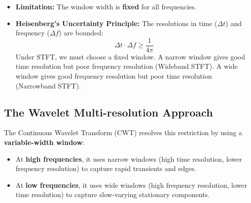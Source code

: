 \documentclass[12pt,a4paper]{article}
\begin{document}
\begin{itemize}[leftmargin=*, itemsep=3.5pt]
  \item \textbf{Limitation:} The window width is \textbf{fixed} for all frequencies. 
  \item \textbf{Heisenberg's Uncertainty Principle:} The resolutions in time ($\Delta t$) and frequency ($\Delta f$) are bounded:
  $$\Delta t \cdot \Delta f \ge \frac{1}{4\pi}$$
  Under STFT, we must choose a fixed window. A narrow window gives good time resolution but poor frequency resolution (Wideband STFT). A wide window gives good frequency resolution but poor time resolution (Narrowband STFT).
\end{itemize}

\subsection{The Wavelet Multi-resolution Approach}
The Continuous Wavelet Transform (CWT) resolves this restriction by using a \textbf{variable-width window}:
\begin{itemize}[leftmargin=*, itemsep=3.5pt]
  \item At \textbf{high frequencies}, it uses narrow windows (high time resolution, lower frequency resolution) to capture rapid transients and edges.
  \item At \textbf{low frequencies}, it uses wide windows (high frequency resolution, lower time resolution) to capture slow-varying stationary components.
\end{itemize}
\end{document}
